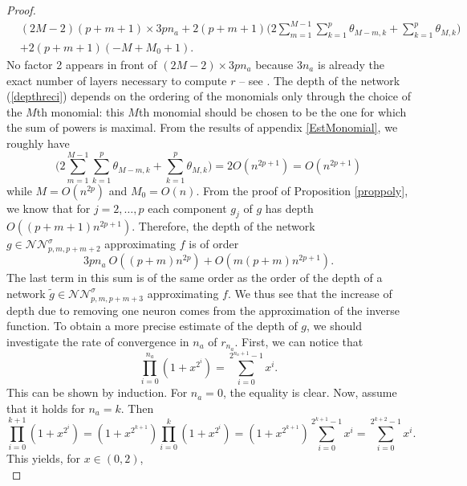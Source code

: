 \documentclass[anon,12pt]{colt2021} %
\begin{document}
\begin{proof}
\begin{align} \label{depthreci}
    & (2M-2)(p+m+1) \times 3pn_{a} + 2(p+m+1) \bigg( 2 \sum_{m=1}^{M-1}  \sum_{k=1}^{p} \theta_{M-m, k} 
    +  \sum_{k=1}^{p} \theta_{M,k} \bigg) \nonumber \\
    &+ 2(p+m+1) (-M+M_{0}+1).
\end{align}
No factor 2 appears in front of $(2M-2) \times 3pn_{a}$ because $3n_{a}$ is already the exact number of layers necessary to compute $r$ -- see \citep[Lemma 4.5]{kidger2019universal}. The depth of the network (\ref{depthreci}) depends on the ordering of the monomials only through the choice of the $M$th monomial: this $M$th monomial should be chosen to be the one for which the sum of powers is maximal. From the results of appendix \ref{EstMonomial}, we roughly have
\begin{equation*}
    \bigg( 2 \sum_{m=1}^{M-1}  \sum_{k=1}^{p} \theta_{M-m, k}  +  \sum_{k=1}^{p} \theta_{M,k} \bigg) = 2 O(n^{2p+1}) = O(n^{2p+1})
\end{equation*}
while $M=O(n^{2p})$ and $M_{0} = O(n)$. From the proof of Proposition \ref{proppoly}, we know that for $j=2, \dots, p$ each component $g_{j}$ of $g$ has depth $O((p+m+1)n^{2p+1})$. Therefore, the depth of the network $g \in \mathcal{NN}_{p,m,p+m+2}^{\sigma}$ approximating $f$ is of order
\begin{equation} \label{depthreci2}
    3pn_{a} \ O((p+m)n^{2p}) + O(m(p+m)n^{2p+1}).
\end{equation}
The last term in this sum is of the same order as the order of the depth of a network $\tilde g \in \mathcal{NN}_{p,m,p+m+3}^{\sigma}$ approximating $f$. We thus see that the increase of depth due to removing one neuron comes from the approximation of the inverse function. To obtain a more precise estimate of the depth of $g$, we should investigate the rate of convergence in $n_{a}$ of $r_{n_{a}}$. First, we can notice that
\begin{equation*}
    \prod_{i=0}^{n_{a}} (1+x^{2^{i}})= \sum_{i=0}^{2^{n_{a}+1}-1} x^{i}.
\end{equation*}
This can be shown by induction. For $n_{a}=0$, the equality is clear. Now, assume that it holds for $n_{a}=k$. Then
\begin{equation*}
    \prod_{i=0}^{k+1} (1+x^{2^{i}})= (1+x^{2^{k+1}}) \prod_{i=0}^{k}(1+x^{2^{i}}) = (1+x^{2^{k+1}}) \sum_{i=0}^{2^{k+1}-1} x^{i} = \sum_{i=0}^{2^{k+2}-1} x^{i}.
\end{equation*}
This yields, for $x \in (0,2)$,
\begin{equation*}

\end{equation*}
\end{proof}
\end{document}
